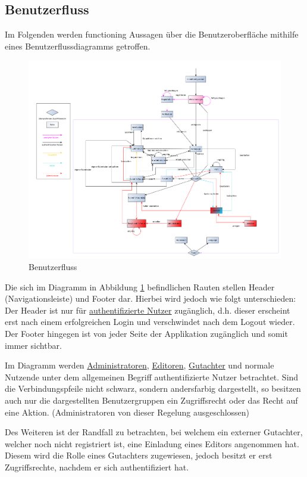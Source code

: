 \subsection{Benutzerfluss}
Im Folgenden werden functioning Aussagen über die Benutzeroberfläche mithilfe eines Benutzerflussdiagramms getroffen.

\begin{figure}[H]
    \centering
    \includegraphics[width=\linewidth]{graphics/benutzerFlussyEd}
    \caption{Benutzerfluss}
	\label{fig:benutzerfluss}
\end{figure}

Die sich im Diagramm in Abbildung \ref{fig:benutzerfluss} befindlichen Rauten stellen Header (Navigationsleiste) und Footer dar.
Hierbei wird jedoch wie folgt unterschieden: Der Header ist nur für \hyperref[glo:regnutzer]{authentifizierte Nutzer} zugänglich,
d.h. dieser erscheint erst nach einem erfolgreichen Login und verschwindet nach dem Logout wieder.
Der Footer hingegen ist von jeder Seite der Applikation zugänglich und somit immer sichtbar.

Im Diagramm werden \hyperref[glo:admin]{Administratoren}, \hyperref[glo:editor]{Editoren}, \hyperref[glo:gutachter]{Gutachter} und normale Nutzende unter dem allgemeinen Begriff
authentifizierte Nutzer betrachtet.
Sind die Verbindungspfeile nicht schwarz, sondern andersfarbig dargestellt, so besitzen auch nur die
dargestellten Benutzergruppen ein Zugriffsrecht oder das Recht auf eine Aktion. (Administratoren von dieser Regelung
ausgeschlossen)

Des Weiteren ist der Randfall zu betrachten, bei welchem ein externer Gutachter, welcher noch nicht registriert ist,
eine Einladung eines Editors angenommen hat.
Diesem wird die Rolle eines Gutachters zugewiesen, jedoch besitzt er erst Zugriffsrechte, nachdem er sich
authentifiziert hat.